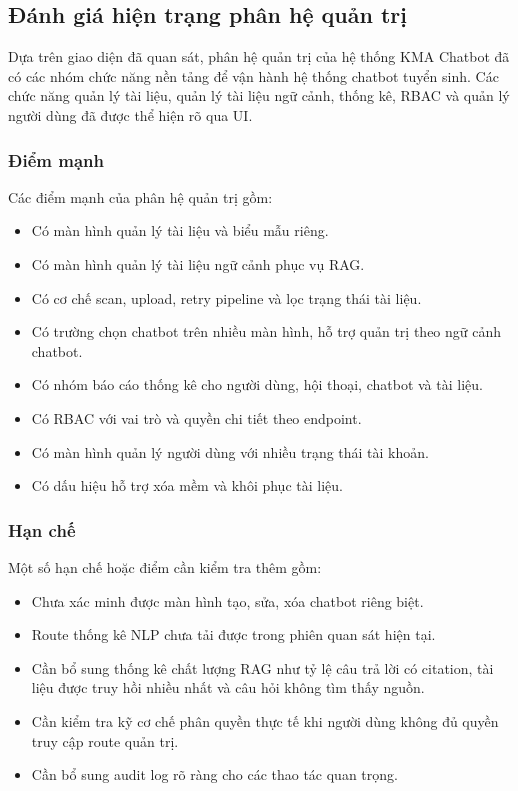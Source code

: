 \subsection{Đánh giá hiện trạng phân hệ quản trị}

Dựa trên giao diện đã quan sát, phân hệ quản trị của hệ thống KMA Chatbot đã có các nhóm chức năng nền tảng để vận hành hệ thống chatbot tuyển sinh. Các chức năng quản lý tài liệu, quản lý tài liệu ngữ cảnh, thống kê, RBAC và quản lý người dùng đã được thể hiện rõ qua UI.

\subsubsection{Điểm mạnh}

Các điểm mạnh của phân hệ quản trị gồm:

\begin{itemize}
    \item Có màn hình quản lý tài liệu và biểu mẫu riêng.
    \item Có màn hình quản lý tài liệu ngữ cảnh phục vụ RAG.
    \item Có cơ chế scan, upload, retry pipeline và lọc trạng thái tài liệu.
    \item Có trường chọn chatbot trên nhiều màn hình, hỗ trợ quản trị theo ngữ cảnh chatbot.
    \item Có nhóm báo cáo thống kê cho người dùng, hội thoại, chatbot và tài liệu.
    \item Có RBAC với vai trò và quyền chi tiết theo endpoint.
    \item Có màn hình quản lý người dùng với nhiều trạng thái tài khoản.
    \item Có dấu hiệu hỗ trợ xóa mềm và khôi phục tài liệu.
\end{itemize}

\subsubsection{Hạn chế}

Một số hạn chế hoặc điểm cần kiểm tra thêm gồm:

\begin{itemize}
    \item Chưa xác minh được màn hình tạo, sửa, xóa chatbot riêng biệt.
    \item Route thống kê NLP chưa tải được trong phiên quan sát hiện tại.
    \item Cần bổ sung thống kê chất lượng RAG như tỷ lệ câu trả lời có citation, tài liệu được truy hồi nhiều nhất và câu hỏi không tìm thấy nguồn.
    \item Cần kiểm tra kỹ cơ chế phân quyền thực tế khi người dùng không đủ quyền truy cập route quản trị.
    \item Cần bổ sung audit log rõ ràng cho các thao tác quan trọng.
\end{itemize}
